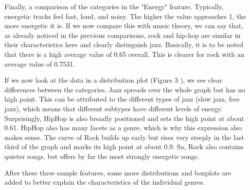 Finally, a comparison of the categories in the "Energy" feature. Typically, energetic tracks feel fast, loud, and noisy. The higher the value approaches 1, the more energetic it is. If we now compare this with music theory, we can say that, as already noticed in the previous comparisons, rock and hip-hop are similar in their characteristics here and clearly distinguish jazz. Basically, it is to be noted that there is a high average value of 0.65 overall. This is clearer for rock with an average value of 0.7531.

If we now look at the data in a distribution plot (Figure 3 ), we see clear differences between the categories. Jazz spreads over the whole graph but has no high point. This can be attributed to the different types of jazz (slow jazz, free jazz), which means that different subtypes have different levels of energy. Surprisingly, HipHop is also broadly positioned and sets the high point at about 0.61. HipHop also has many facets as a genre, which is why this expression also makes sense. The curve of Rock builds up early but rises very steeply in the last third of the graph and marks its high point at about 0.9. So, Rock also contains quieter songs, but offers by far the most strongly energetic songs.

After these three sample features, some more distributions and boxplots are added to better explain the characteristics of the individual genres.






